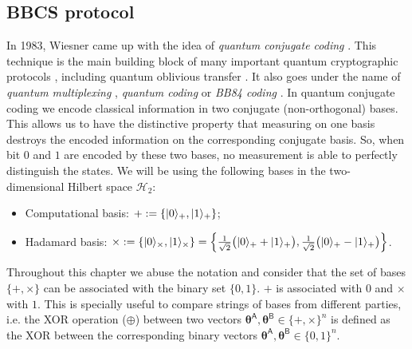 \subsection{BBCS protocol}\label{sec:BBCS}

In 1983, Wiesner came up with the idea of \textit{quantum conjugate coding} \cite{W83}. This technique is the main building block of many important quantum cryptographic protocols \cite{BB84, BBBW83, DFSS14}, including quantum oblivious transfer \cite{BBCS92}. It also goes under the name of \textit{quantum multiplexing} \cite{BBBW83}, \textit{quantum coding} \cite{BBB14} or \textit{BB84 coding} \cite{S99}. In quantum conjugate coding we encode classical information in two conjugate (non-orthogonal) bases. This allows us to have the distinctive property that measuring on one basis destroys the encoded information on the corresponding conjugate basis. So, when bit $0$ and $1$ are encoded by these two bases, no measurement is able to perfectly distinguish the states. We will be using the following bases in the two-dimensional Hilbert space $\mathcal{H}_2$:

\begin{itemize}
    \item Computational basis: $+ := \left\{| 0 \rangle_{+}, | 1 \rangle_{+}\right\}$;
    \item Hadamard basis: $\times := \left\{| 0 \rangle_{\times}, | 1 \rangle_{\times}\right\} = \left\{\frac{1}{\sqrt{2}}\big( | 0 \rangle_{+} + | 1 \rangle_{+} \big), \frac{1}{\sqrt{2}}\big( | 0 \rangle_{+} - | 1 \rangle_{+} \big) \right\}$.
\end{itemize}

Throughout this chapter we abuse the notation and consider that the set of bases $\{+,\times\}$ can be associated with the binary set $\{0,1\}$. $+$ is associated with $0$ and $\times$ with $1$. This is specially useful to compare strings of bases from different parties, i.e. the XOR operation ($\oplus$) between two vectors $\bm{\theta}^{\mathsf{A}}, \bm{\theta}^{\mathsf{B}} \in\{+,\times\}^n$ is defined as the XOR between the corresponding binary vectors $\bm{\theta}^{\mathsf{A}}, \bm{\theta}^{\mathsf{B}} \in\{0,1\}^n$.

\

